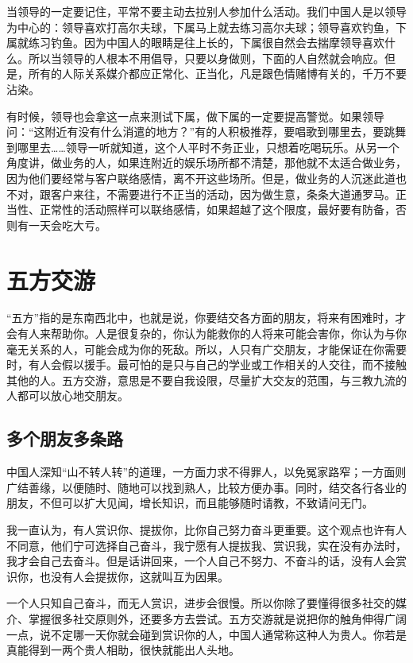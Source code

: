 \documentclass[fontset=fandol, a4paper, 12pt, openright]{ctexbook}
\begin{document}
当领导的一定要记住，平常不要主动去拉别人参加什么活动。我们中国人是以领导为中心的：领导喜欢打高尔夫球，下属马上就去练习高尔夫球；领导喜欢钓鱼，下属就练习钓鱼。因为中国人的眼睛是往上长的，下属很自然会去揣摩领导喜欢什么。所以当领导的人根本不用倡导，只要以身做则，下面的人自然就会响应。但是，所有的人际关系媒介都应正常化、正当化，凡是跟色情赌博有关的，千万不要沾染。

有时候，领导也会拿这一点来测试下属，做下属的一定要提高警觉。如果领导问：“这附近有没有什么消遣的地方？”有的人积极推荐，要唱歌到哪里去，要跳舞到哪里去……领导一听就知道，这个人平时不务正业，只想着吃喝玩乐。从另一个角度讲，做业务的人，如果连附近的娱乐场所都不清楚，那他就不太适合做业务，因为他们要经常与客户联络感情，离不开这些场所。但是，做业务的人沉迷此道也不对，跟客户来往，不需要进行不正当的活动，因为做生意，条条大道通罗马。正当性、正常性的活动照样可以联络感情，如果超越了这个限度，最好要有防备，否则有一天会吃大亏。


\chapter{五方交游}
“五方”指的是东南西北中，也就是说，你要结交各方面的朋友，将来有困难时，才会有人来帮助你。人是很复杂的，你认为能救你的人将来可能会害你，你认为与你毫无关系的人，可能会成为你的死敌。所以，人只有广交朋友，才能保证在你需要时，有人会假以援手。最可怕的是只与自己的学业或工作相关的人交往，而不接触其他的人。五方交游，意思是不要自我设限，尽量扩大交友的范围，与三教九流的人都可以放心地交朋友。

\section{多个朋友多条路}

中国人深知“山不转人转”的道理，一方面力求不得罪人，以免冤家路窄；一方面则广结善缘，以便随时、随地可以找到熟人，比较方便办事。同时，结交各行各业的朋友，不但可以扩大见闻，增长知识，而且能够随时请教，不致请问无门。

我一直认为，有人赏识你、提拔你，比你自己努力奋斗更重要。这个观点也许有人不同意，他们宁可选择自己奋斗，我宁愿有人提拔我、赏识我，实在没有办法时，我才会自己去奋斗。但是话讲回来，一个人自己不努力、不奋斗的话，没有人会赏识你，也没有人会提拔你，这就叫互为因果。

一个人只知自己奋斗，而无人赏识，进步会很慢。所以你除了要懂得很多社交的媒介、掌握很多社交原则外，还要多方去尝试。五方交游就是说把你的触角伸得广阔一点，说不定哪一天你就会碰到赏识你的人，中国人通常称这种人为贵人。你若是真能得到一两个贵人相助，很快就能出人头地。
\end{document}

